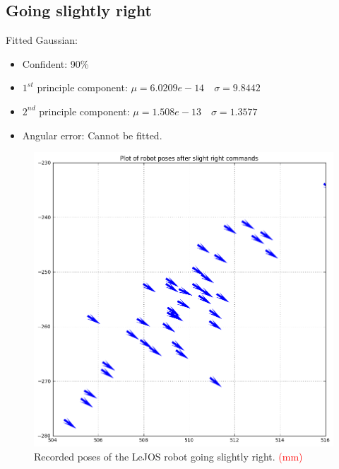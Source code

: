 \documentclass[paper=a4, fontsize=11pt]{scrartcl} %
\begin{document}
    \subsection{Going slightly right}
	    Fitted Gaussian:
	    \begin{itemize}
	       	\item Confident: 90\%
		    \item $1^{st}$ principle component: $\mu = 6.0209e-14 \quad \sigma = 9.8442$
		    \item $2^{nd}$ principle component: $\mu = 1.508e-13 \quad \sigma = 1.3577$
		    \item Angular error: Cannot be fitted.
	    \end{itemize}
    \begin{figure}[H]
        \begin{center}
            \setlength{\fboxsep}{0.5pt} %
            \setlength{\fboxrule}{0.5pt}
            \includegraphics[width=12cm,fbox]{images/poses_plot_3_slightRight.png}
            \caption{Recorded poses of the LeJOS robot going slightly right. \textcolor{red}{(mm)}}
        \end{center}
    \end{figure}
\end{document}
